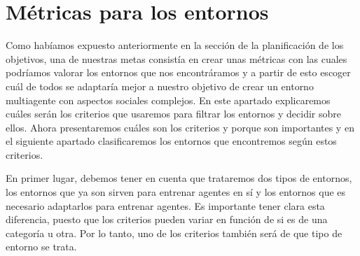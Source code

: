\section{Métricas para los entornos}
Como habíamos expuesto anteriormente en la sección de la planificación de los objetivos, una de nuestras metas consistía en crear unas métricas con las cuales podríamos valorar los entornos que nos encontráramos y a partir de esto escoger cuál de todos se adaptaría mejor a nuestro objetivo de crear un entorno multiagente con aspectos sociales complejos. En este apartado explicaremos cuáles serán los criterios que usaremos para filtrar los entornos y decidir sobre ellos. Ahora presentaremos cuáles son los criterios y porque son importantes y en el siguiente apartado clasificaremos los entornos que encontremos según estos criterios. 

En primer lugar, debemos tener en cuenta que trataremos dos tipos de entornos, los entornos que ya son sirven para entrenar agentes en sí y los entornos que es necesario adaptarlos para entrenar agentes. Es importante tener clara esta diferencia, puesto que los criterios pueden variar en función de si es de una categoría u otra. Por lo tanto, uno de los criterios también será de que tipo de entorno se trata.  


